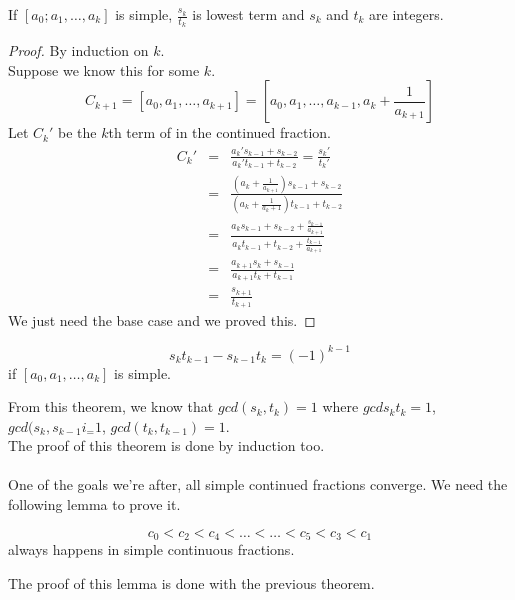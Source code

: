    \begin{theorem}
    If $[a_0; a_1, \ldots, a_k]$ is simple, $\frac{s_k}{t_k}$ is lowest term
    and $s_k$ and $t_k$ are integers.\\
   \end{theorem}
   \begin{proof}
    By induction on $k$.\\
    Suppose we know this for some $k$.\\
    $$
      C_{k+1} = [a_0, a_1, \ldots, a_{k +1}] = [a_0, a_1, \ldots, a_{k - 1}, a_k 
      + \frac{1}{a_{k+1}}]
    $$
    Let $C_k'$ be the $k$th term of in the continued fraction.\\
    \begin{eqnarray*}
      C_k' & = & \frac{a_k' s_{k-1} + s_{k-2}}{a_k' t_{k-1} + t_{k-2}} = \frac{s_k'}{t_k'}\\
      & = & \frac{(a_k + \frac{1}{a_{k+1}})s_{k-1} + s_{k-2}}{(a_k + \frac{1}
      {a_k+1})t_{k-1} + t_{k-2}}\\
      & = & \frac{a_ks_{k - 1} + s_{k - 2} + \frac{s_{k-1}}{a_{k+1}}}{a_kt_{k - 1} + t_{k - 2} + \frac{t_{k-1}}{a_{k+1}}}\\
      & = & \frac{a_{k+1}s_k + s_{k - 1}}{a_{k+1}t_k + t_{k-1}}\\
      & = & \frac{s_{k+1}}{t_{k+1}}
    \end{eqnarray*}
    We just need the base case and we proved this.
   \end{proof}
   \begin{theorem}
    $$
      s_kt_{k-1} - s_{k - 1}t_k = (-1)^{k-1}
    $$
    if $[a_0, a_1, \ldots, a_k]$ is simple.
   \end{theorem}
   From this theorem, we know that $gcd(s_k, t_k) = 1$ where $gcd{s_k}{t_k} = 
   1$, $gcd(s_k, s_{k-1}i_ = 1$, $gcd(t_k, t_{k-1}) = 1$.\\
   The proof of this theorem is done by induction too.\\\\
   One of the goals we're after, all simple continued fractions converge. We
   need the following lemma to prove it.\\
   \begin{lemma}
    $$
      c_0 < c_2 < c_4 < \ldots < \ldots < c_5 < c_3 < c_1
    $$
    always happens in simple continuous fractions.
   \end{lemma}
   The proof of this lemma is done with the previous theorem.
